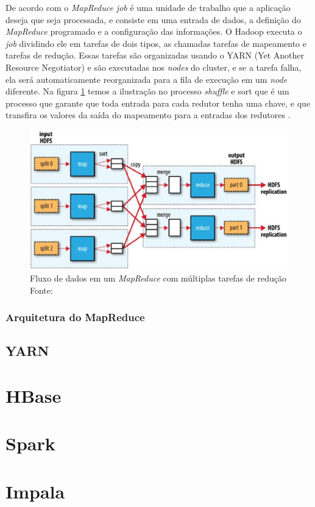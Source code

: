             De acordo com  o \textit{MapReduce job} é uma unidade de trabalho que a aplicação
            deseja que seja processada, e consiste em uma entrada de dados, a definição do \textit{MapReduce} programado
            e a configuração das informações. O Hadoop executa o \textit{job} dividindo ele em tarefas de dois tipos, as
            chamadas tarefas de mapeamento e tarefas de redução. Essas tarefas são organizadas usando o YARN (Yet
            Another Resource Negotiator) e são executadas nos \textit{nodes} do cluster, e se a tarefa falha, ela será
            automaticamente reorganizada para a fila de execução em um \textit{node} diferente. Na figura \ref{figura5}
            temos a ilustração no processo \textit{shuffle} e {sort} que é um processo que garante que toda entrada para
            cada redutor tenha uma chave, e que transfira os valores da saída do mapeamento para a entradas dos
            redutores \cite{white2015}.

            \begin{figure}[ht!]
                    \centering
                    \includegraphics[keepaspectratio=true,scale=0.75]
                        {figuras/figura5.eps}
                    \caption[Fluxo de dados em um \textit{MapReduce} com múltiplas tarefas de redução]
                    {Fluxo de dados em um \textit{MapReduce} com múltiplas tarefas de redução
                    \protect \linebreak Fonte: }
                    \label{figura5}
            \end{figure}

            \subsubsection{Arquitetura do MapReduce}


        \subsection{YARN}


    \section{HBase}

    \section{Spark}

    \section{Impala}



